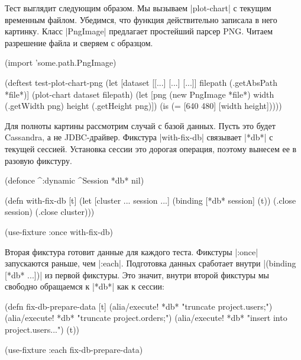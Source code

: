 Тест выглядит следующим образом. Мы вызываем \spverb|plot-chart| с текущим
временным файлом. Убедимся, что функция действительно записала в него
картинку. Класс \spverb|PngImage| предлагает простейший парсер PNG. Читаем
разрешение файла и сверяем с образцом.

\begin{english}
  \begin{clojure}
(import 'some.path.PngImage)

(deftest test-plot-chart-png
  (let [dataset [[...] [...] [...]]
        filepath (.getAbsPath *file*)]
    (plot-chart dataset filepath)
    (let [png (new PngImage *file*)
          width (.getWidth png)
          height (.getHeight png)])
    (is (= [640 480] [width height]))))
  \end{clojure}
\end{english}

Для полноты картины рассмотрим случай с базой данных. Пусть это будет Cassandra,
а не JDBC-драйвер. Фикстура \spverb|with-fix-db| связывает \spverb|*db*| с
текущей сессией. Установка сессии это дорогая операция, поэтому вынесем ее в
разовую фикстуру.

\begin{english}
  \begin{clojure}
(defonce ^:dynamic ^Session *db* nil)

(defn with-fix-db [t]
  (let [cluster ...
        session ...]
    (binding [*db* session]
      (t))
    (.close session)
    (.close cluster)))

(use-fixture :once with-fix-db)
  \end{clojure}
\end{english}

Вторая фикстура готовит данные для каждого теста. Фикстуры \spverb|:once|
запускаются раньше, чем \spverb|:each|. Подготовка данных сработает внутри
\spverb|(binding [*db* ...])| из первой фикстуры. Это значит, внутри второй
фикстуры мы свободно обращаемся к \spverb|*db*| как к сессии:

\begin{english}
  \begin{clojure}
(defn fix-db-prepare-data [t]
  (alia/execute! *db* "truncate project.users;")
  (alia/execute! *db* "truncate project.orders;")
  (alia/execute! *db* "insert into project.users...")
  (t))

(use-fixture :each fix-db-prepare-data)
  \end{clojure}
\end{english}

